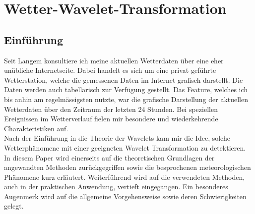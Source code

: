 %
%
%
\chapter{Wetter-Wavelet-Transformation\label{chapter:wwt}}
\begin{refsection}




\lstset{style=mystyle}


\section{Einführung}


Seit Langem konsultiere ich meine aktuellen Wetterdaten über eine eher unübliche Internetseite.
Dabei handelt es sich um eine privat geführte Wetterstation, welche die gemessenen Daten im Internet grafisch darstellt.
Die Daten werden auch tabellarisch zur Verfügung gestellt.
Das Feature, welches ich bis anhin am regelmässigsten nutzte, war die grafische Darstellung der aktuellen Wetterdaten über den Zeitraum der letzten 24 Stunden.
Bei speziellen Ereignissen im Wetterverlauf fielen mir besondere und wiederkehrende Charakteristiken auf.
\\

Nach der Einführung in die Theorie der Wavelets kam mir die Idee, solche Wetterphänomene mit einer geeigneten Wavelet Transformation zu detektieren.
In diesem Paper wird einerseits auf die theoretischen Grundlagen der angewandten Methoden zurückgegriffen sowie die besprochenen meteorologischen Phänomene kurz erläutert. 
Weiterführend wird auf die verwendeten Methoden, auch in der praktischen Anwendung, vertieft eingegangen.
Ein besonderes Augenmerk wird auf die allgemeine Vorgehensweise sowie deren Schwierigkeiten gelegt.
\\





\end{refsection}
